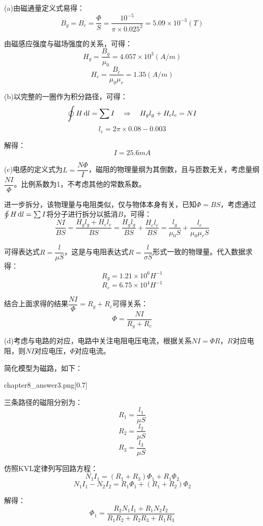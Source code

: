\begin{solution}
    (a)由磁通量定义式易得：
    \[B_g = B_c = \dfrac{\Phi}{S} = \dfrac{10^{-5}}{\pi \times 0.025^2} = 5.09\times 10^{-3} (T)\]

    由磁感应强度与磁场强度的关系，可得：
    \[H_g = \dfrac{B_g}{\mu_0} = 4.057 \times 10^{3} (A/m)\]
    \[H_c = \dfrac{B_c}{\mu_0\mu_r} = 1.35 (A/m)\]

    (b)以完整的一圈作为积分路径，可得：
    \[\oint H\dif l = \sum I\quad\Rightarrow\quad H_g l_g + H_c l_c = NI\]
    \[l_c = 2\pi \times 0.08 - 0.003\]

    解得：
    \[I = 25.6 mA\]

    (c)电感的定义式为$L = \dfrac{N\Phi}{I}$，磁阻的物理量纲为其倒数，且与匝数无关，考虑量纲$\dfrac{NI}{\Phi}$。比例系数为1，不考虑其他的常数系数。

    进一步拆分，该物理量与电阻类似，仅与物体本身有关，已知$\Phi = BS$，考虑通过$\oint H\dif l = \sum I$将分子进行拆分以抵消$B$，可得：
    \[\dfrac{NI}{BS} = \dfrac{H_g l_g + H_c l_c}{BS} =\dfrac{H_g l_g}{BS} + \dfrac{H_c l_c}{BS} = \dfrac{l_g}{\mu_0 S} + \dfrac{l_c}{\mu_0\mu_r S}\]

    可得表达式$R = \dfrac{l}{\mu S}$，这是与电阻表达式$R = \dfrac{l}{\sigma S}$形式一致的物理量。代入数据求得：
    \[R_g = 1.21\times 10^{6} H^{-1}\]
    \[R_c = 6.75\times 10^{4} H^{-1}\]

    结合上面求得的结果$\dfrac{NI}{\Phi} = R_g + R_c$可得关系：
    \[\Phi = \dfrac{NI}{R_g + R_c}\]
    
    (d)考虑与电路的对应，电路中关注电阻电压电流，根据关系$NI = \Phi R$，$R$对应电阻，则$NI$对应电压，$\Phi$对应电流。

    简化模型为磁路，如下：
    \begin{singlefigure}{chapter8_answer3.png}[0.7]
    \end{singlefigure}

    三条路径的磁阻分别为：
    \[R_1 = \dfrac{l_1}{\mu S}\]
    \[R_2 = \dfrac{l_2}{\mu S}\]
    \[R_3 = \dfrac{l_3}{\mu S}\]

    仿照KVL定律列写回路方程：
    \[N_1I_1 = (R_1 + R_3)\Phi_1 + R_1\Phi_2\]
    \[N_1 I_1 - N_2 I_2 = R_1\Phi_1 + (R_1 + R_2)\Phi_2\]

    解得：
    \[\Phi_1 = \dfrac{R_2 N_1 I_1 + R_1 N_2 I_2}{R_1 R_2 + R_2 R_3 + R_1 R_3}\]
\end{solution}

